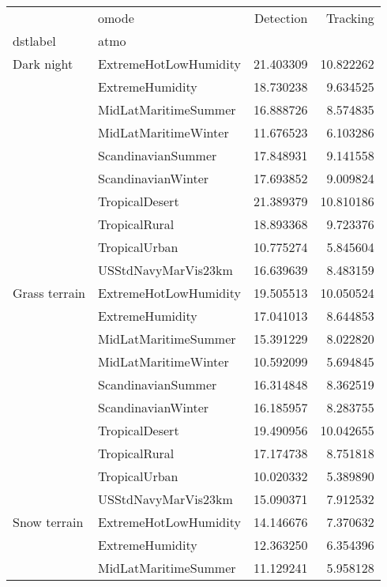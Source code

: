 \begin{tabular}{llrr}
\toprule
             & omode &  Detection &   Tracking \\
dstlabel & atmo &            &            \\
\midrule
Dark night & ExtremeHotLowHumidity &  21.403309 &  10.822262 \\
             & ExtremeHumidity &  18.730238 &   9.634525 \\
             & MidLatMaritimeSummer &  16.888726 &   8.574835 \\
             & MidLatMaritimeWinter &  11.676523 &   6.103286 \\
             & ScandinavianSummer &  17.848931 &   9.141558 \\
             & ScandinavianWinter &  17.693852 &   9.009824 \\
             & TropicalDesert &  21.389379 &  10.810186 \\
             & TropicalRural &  18.893368 &   9.723376 \\
             & TropicalUrban &  10.775274 &   5.845604 \\
             & USStdNavyMarVis23km &  16.639639 &   8.483159 \\
Grass terrain & ExtremeHotLowHumidity &  19.505513 &  10.050524 \\
             & ExtremeHumidity &  17.041013 &   8.644853 \\
             & MidLatMaritimeSummer &  15.391229 &   8.022820 \\
             & MidLatMaritimeWinter &  10.592099 &   5.694845 \\
             & ScandinavianSummer &  16.314848 &   8.362519 \\
             & ScandinavianWinter &  16.185957 &   8.283755 \\
             & TropicalDesert &  19.490956 &  10.042655 \\
             & TropicalRural &  17.174738 &   8.751818 \\
             & TropicalUrban &  10.020332 &   5.389890 \\
             & USStdNavyMarVis23km &  15.090371 &   7.912532 \\
Snow terrain & ExtremeHotLowHumidity &  14.146676 &   7.370632 \\
             & ExtremeHumidity &  12.363250 &   6.354396 \\
             & MidLatMaritimeSummer &  11.129241 &   5.958128 \\

\end{tabular}

